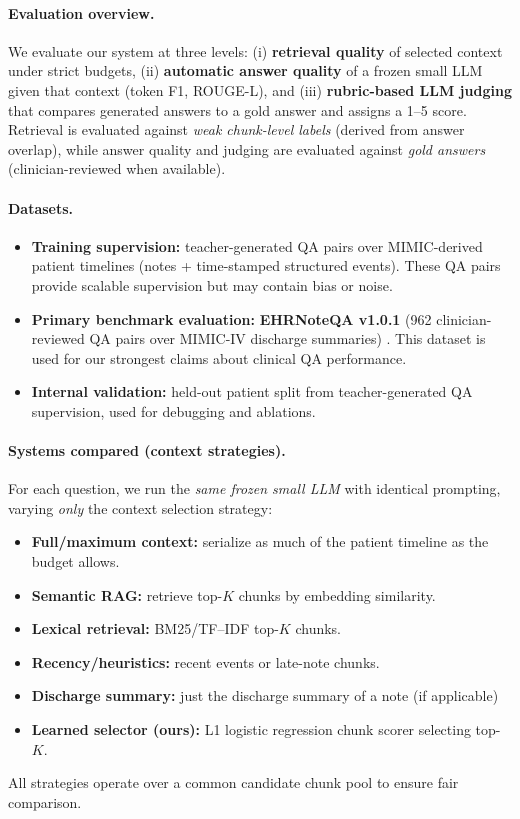 
\paragraph{Evaluation overview.}
We evaluate our system at three levels: (i) \textbf{retrieval quality} of selected context under strict budgets, (ii) \textbf{automatic answer quality} of a frozen small LLM given that context (token F1, ROUGE-L), and (iii) \textbf{rubric-based LLM judging} that compares generated answers to a gold answer and assigns a 1--5 score. Retrieval is evaluated against \emph{weak chunk-level labels} (derived from answer overlap), while answer quality and judging are evaluated against \emph{gold answers} (clinician-reviewed when available).

\paragraph{Datasets.}
\begin{itemize}
  \item \textbf{Training supervision:} teacher-generated QA pairs over MIMIC-derived patient timelines (notes + time-stamped structured events). These QA pairs provide scalable supervision but may contain bias or noise.
  \item \textbf{Primary benchmark evaluation:} \textbf{EHRNoteQA v1.0.1} (962 clinician-reviewed QA pairs over MIMIC-IV discharge summaries) \citep{PhysioNet-ehr-notes-qa-llms-1.0.1}. This dataset is used for our strongest claims about clinical QA performance.
  \item \textbf{Internal validation:} held-out patient split from teacher-generated QA supervision, used for debugging and ablations.
\end{itemize}

\paragraph{Systems compared (context strategies).}
For each question, we run the \emph{same frozen small LLM} with identical prompting, varying \emph{only} the context selection strategy:
\begin{itemize}
  \item \textbf{Full/maximum context:} serialize as much of the patient timeline as the budget allows.
  \item \textbf{Semantic RAG:} retrieve top-$K$ chunks by embedding similarity.
  \item \textbf{Lexical retrieval:} BM25/TF--IDF top-$K$ chunks.
  \item \textbf{Recency/heuristics:} recent events or late-note chunks.
  \item \textbf{Discharge summary:} just the discharge summary of a note (if applicable)
  \item \textbf{Learned selector (ours):} L1 logistic regression chunk scorer selecting top-$K$.
\end{itemize}
All strategies operate over a common candidate chunk pool to ensure fair comparison.

